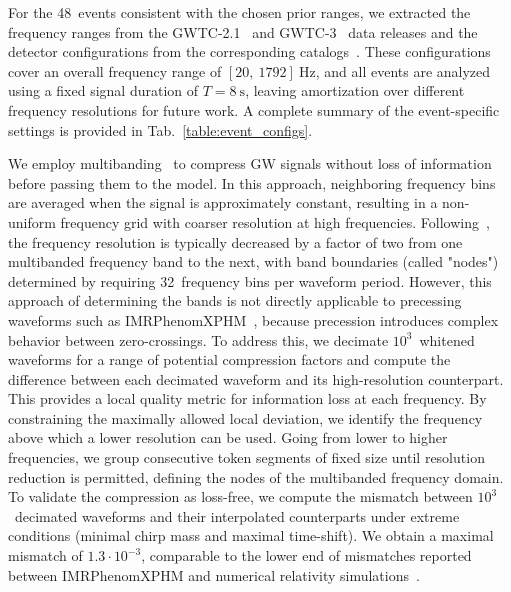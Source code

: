 For the 48~events consistent with the chosen prior ranges, we extracted the frequency ranges from the \mbox{GWTC-2.1}~\citep{ligo_data_release_gwtc21_zenodo:2022} and \mbox{GWTC-3}~\citep{ligo_data_release_gwtc3_zenodo:2021} data releases and the detector configurations from the corresponding catalogs~\citep{ligo_gwtc-21:2024, ligo_gwtc-3:2023}.
These configurations cover an overall frequency range of $[20,~1792]~\si{\hertz}$, and all events are analyzed using a fixed signal duration of \mbox{$T = \SI{8}{\second}$}, leaving amortization over different frequency resolutions for future work. 
A complete summary of the event-specific settings is provided in Tab.~\ref{table:event_configs}.

We employ multibanding~\citep{vinciguerra_mb:2017, morisaki:2021} to compress GW signals without loss of information before passing them to the \dingoT model. 
In this approach, neighboring frequency bins are averaged when the signal is approximately constant, resulting in a non-uniform frequency grid with coarser resolution at high frequencies.
Following~\citep{dax_bns:2025}, the frequency resolution is typically decreased by a factor of two from one multibanded frequency band to the next, with band boundaries (called "nodes") determined by requiring 32~frequency bins per waveform period. 
However, this approach of determining the bands is not directly applicable to precessing waveforms such as IMRPhenomXPHM~\citep{pratten_imrphenomxphm:2021}, because precession introduces complex behavior between zero-crossings. 
To address this, we decimate $10^3$~whitened waveforms for a range of potential compression factors and compute the difference between each decimated waveform and its high-resolution counterpart. 
This provides a local quality metric for information loss at each frequency. 
By constraining the maximally allowed local deviation, we identify the frequency above which a lower resolution can be used. 
Going from lower to higher frequencies, we group consecutive token segments of fixed size until resolution reduction is permitted, defining the nodes of the multibanded frequency domain.
To validate the compression as loss-free, we compute the mismatch between $10^3$~decimated waveforms and their interpolated counterparts under extreme conditions (minimal chirp mass and maximal time-shift). 
We obtain a maximal mismatch of \mbox{$1.3\cdot 10^{-3}$}, comparable to the lower end of mismatches reported between IMRPhenomXPHM and numerical relativity simulations~\citep{pratten_imrphenomxphm:2021}.

